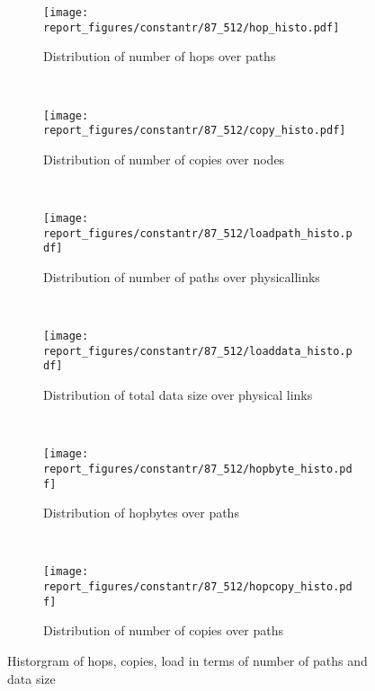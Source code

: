 \begin{figure}[!htbp]
        \centering
        \begin{subfigure}[b]{0.49\textwidth}
                \texttt{[image: report\_figures/constantr/87\_512/hop\_histo.pdf]}
                \caption{Distribution of number of hops over paths}
                \label{fig:87_512_hop}
        \end{subfigure}%
        ~ %
        \begin{subfigure}[b]{0.49\textwidth}
                \texttt{[image: report\_figures/constantr/87\_512/copy\_histo.pdf]}
                \caption{Distribution of number of copies over nodes}
                \label{fig:87_512_copy}
        \end{subfigure}
        ~ %
        \begin{subfigure}[b]{0.49\textwidth}
                \texttt{[image: report\_figures/constantr/87\_512/loadpath\_histo.pdf]}
                \caption{Distribution of number of paths over physicallinks}
                \label{fig:87_512_loadpath}
        \end{subfigure}
        ~ %
        \begin{subfigure}[b]{0.49\textwidth}
                \texttt{[image: report\_figures/constantr/87\_512/loaddata\_histo.pdf]}
                \caption{Distribution of total data size over physical links}
                \label{fig:87_512_loaddata}
        \end{subfigure}
        ~ %
        \begin{subfigure}[b]{0.49\textwidth}
                \texttt{[image: report\_figures/constantr/87\_512/hopbyte\_histo.pdf]}
                \caption{Distribution of hopbytes over paths}
                \label{fig:87_512_hopbyte}
        \end{subfigure}
        ~ %
        \begin{subfigure}[b]{0.49\textwidth}
                \texttt{[image: report\_figures/constantr/87\_512/hopcopy\_histo.pdf]}
                \caption{Distribution of number of copies over paths}
                \label{fig:87_512_hopcopy}
        \end{subfigure}
        \caption{Historgram of hops, copies, load in terms of number of paths and data size}
        \label{fig:87_512_histo}
\end{figure}

